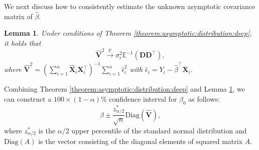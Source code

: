 \documentclass[11pt, preprint]{imsart}
\numberwithin{equation}{section}
\def \bfD{\mathbf{D}}
\def \bfX{\mathbf{X}}
\def \bfV{\mathbf{V}}
\def \bfD{\mathbf{D}}
\def \ev{\mathbb{E}}
\def \cid{\xrightarrow[\text{}]{\text{$\mathbb{L}$}}}
\def \cip{\xrightarrow[\text{}]{\text{$\mathbb{P}$}}}
\theoremstyle{plain}
\newtheorem{theorem}{\indent Theorem}
\newtheorem{lemma}{\indent Lemma}
\theoremstyle{definition}
\begin{document}
We next discuss how to consistently estimate the unknown asymptotic covariance matrix of $\widehat{\beta}$.

\begin{lemma}\label{lemma:estimation:variance}
Under conditions of Theorem \ref{theorem:asymptotic:distribution:deep}, it holds that $$\widehat{\bfV}^2\cip \sigma_\epsilon^2\ev^{-1}(\bfD\bfD^\top),$$ where $\widehat{\bfV}^2= (\sum_{i=1}^n\widehat{\bfX}_i\bfX_i^\top) ^{-1}\sum_{i=1}^n\widehat{\epsilon}_i^2$ with $\widehat{\epsilon}_i=Y_i-\widehat{\beta}^\top \bfX_i$.
\end{lemma}
Combining Theorem \ref{theorem:asymptotic:distribution:deep} and Lemma \ref{lemma:estimation:variance}, we can construct a $100\times(1-\alpha)\%$ confidence interval for $\beta_0$ as follows:
\begin{equation}\label{eq:confidence:interval}
	\widehat{\beta}\pm \frac{z_{\alpha/2}^*}{\sqrt{n}}\textrm{Diag}(\widehat{\bfV}),
\end{equation}
where $z_{\alpha/2}^*$ is the $\alpha/2$ upper percentile of the standard normal distribution and $\textrm{Diag}(A)$ is the vector consisting of the diagonal elements of squared matrix $A$.
\end{document}
